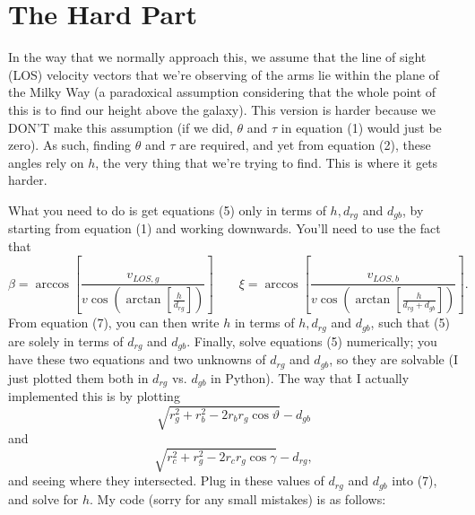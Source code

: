 \documentclass[12pt]{article}
\begin{document}
	\section{The Hard Part}
	\par In the way that we normally approach this, we assume that the line of sight (LOS) velocity vectors that we're observing of the arms lie within the plane of the Milky Way (a paradoxical assumption considering that the whole point of this is to find our height above the galaxy). This version is harder because we DON'T make this assumption (if we did, $\theta$ and $\tau$ in equation (1) would just be zero). As such, finding $\theta$ and $\tau$ are required, and yet from equation (2), these angles rely on $h$, the very thing that we're trying to find. This is where it gets harder.
	\par What you need to do is get equations (5) only in terms of $h, d_{rg}$ and $d_{gb}$, by starting from equation (1) and working downwards. You'll need to use the fact that
	\begin{equation}
		\beta=\arccos\left[\frac{v_{LOS,g}}{\displaystyle v\cos\left(\arctan\left[\frac{h}{d_{rg}}\right]\right)}\right] \qquad \xi=\arccos\left[\frac{v_{LOS,b}}{\displaystyle v\cos\left(\arctan\left[\frac{h}{d_{rg}+d_{gb}}\right]\right)}\right].
	\end{equation}
	From equation (7), you can then write $h$ in terms of $h, d_{rg}$ and $d_{gb}$, such that (5) are solely in terms of $d_{rg}$ and $d_{gb}$. Finally, solve equations (5) numerically; you have these two equations and two unknowns of $d_{rg}$ and $d_{gb}$, so they are solvable (I just plotted them both in $d_{rg}$ vs. $d_{gb}$ in Python). The way that I actually implemented this is by plotting 
	\begin{equation}
	\sqrt{r_g^2+r_b^2-2r_br_g\cos\vartheta} - d_{gb}
	\end{equation} and 
	\begin{equation}
	\sqrt{r_c^2+r_g^2-2r_cr_g\cos\gamma} - d_{rg},
	\end{equation}
	 and seeing where they intersected.
	Plug in these values of $d_{rg}$ and $d_{gb}$ into (7), and solve for $h$. My code (sorry for any small mistakes) is as follows:
\end{document}
